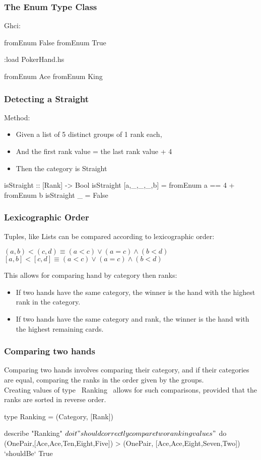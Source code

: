 \documentclass[11pt,xcolor={dvipsnames}]{beamer}
\newcommand{\tc}{\textcolor}
\newcommand{\key}[1]{\tc{orange}{#1}}
\newcommand{\rk}{\enskip{\key{$\hookleftarrow$}}}
\newcommand{\vs}{\vspace{1em}}
\begin{document}
\begin{frame}[fragile]
\frametitle{The Enum Type Class}
Ghci:
\begin{term}
fromEnum False\rk
fromEnum True\rk

:load PokerHand.hs\rk

fromEnum Ace\rk
fromEnum King\rk
\end{term}
\end{frame}
\begin{frame}[fragile]
\frametitle{Detecting a Straight}
Method:
\begin{itemize}
\item  Given a list of 5 distinct groups of 1 rank each, 
\item  And   the first rank value = the last rank value + 4
\item  Then  the category is Straight
\end{itemize}
\begin{haskell}
isStraight :: [Rank] -> Bool
isStraight [a,_,_,_,b] = fromEnum a == 4 + fromEnum b 
isStraight _               = False 
\end{haskell}
\end{frame}
\begin{frame}[fragile]
\frametitle{Lexicographic Order}
Tuples, like Lists can be compared according to lexicographic order:
\begin{center}
$(a,b) < (c,d) \equiv (a<c) \vee (a=c) \wedge (b<d)$\\
\vs
$[a,b] < [c,d] \equiv (a<c) \vee (a=c) \wedge (b<d)$
\end{center}
This allows for comparing hand by category then ranks:
\begin{itemize}
\item  If two hands have the same category, the winner is the hand with the highest rank in the category.
\item  If two hands have the same category and rank, the winner is the hand with the highest remaining cards. 
\end{itemize}
\end{frame}
\begin{frame}[fragile]
\frametitle{Comparing two hands}
Comparing two hands involves comparing their category, and if their categories are equal, comparing the ranks in the order given by the groups.\\
\vs
Creating values of type ~Ranking~ allows for such comparisons, provided that the ranks are sorted in reverse order.
\begin{haskell}
type Ranking = (Category, [Rank])

describe "Ranking" $ do
    it "should correctly compare two ranking values" $ do 
        (OnePair,[Ace,Ace,Ten,Eight,Five]) 
            > (OnePair, [Ace,Ace,Eight,Seven,Two])
             `shouldBe` True
\end{haskell}
\end{frame}
\end{document}
